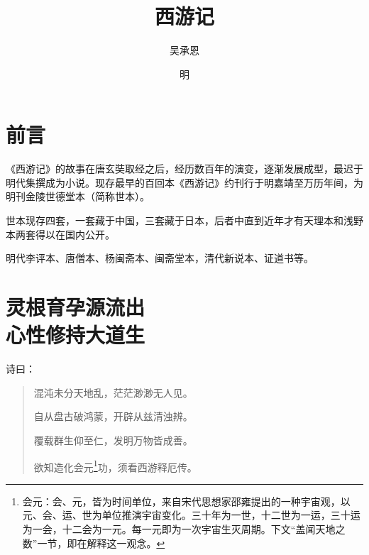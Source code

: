 \documentclass[12pt,UTF8]{ctexbook}
\title{\heiti\zihao{0} 西游记}
\author{吴承恩}
\date{明}
\begin{document}
\maketitle
\tableofcontents

\frontmatter

\chapter{前言}

《西游记》的故事在唐玄奘取经之后，经历数百年的演变，逐渐发展成型，最迟于明代集撰成为小说。现存最早的百回本《西游记》约刊行于明嘉靖至万历年间，为明刊金陵世德堂本（简称世本）。

世本现存四套，一套藏于中国，三套藏于日本，后者中直到近年才有天理本和浅野本两套得以在国内公开。

明代李评本、唐僧本、杨闽斋本、闽斋堂本，清代新说本、证道书等。

\mainmatter

\chapter[灵根育孕源流出\ 心性修持大道生]{灵根育孕源流出\\心性修持大道生}

诗曰：

\begin{quotation}
混沌未分天地乱，茫茫渺渺无人见。

自从盘古破鸿蒙，开辟从兹清浊辨。

覆载群生仰至仁，发明万物皆成善。

欲知造化会元\footnote{会元：会、元，皆为时间单位，来自宋代思想家邵雍提出的一种宇宙观，以元、会、运、世为单位推演宇宙变化。三十年为一世，十二世为一运，三十运为一会，十二会为一元。每一元即为一次宇宙生灭周期。下文“盖闻天地之数”一节，即在解释这一观念。}功，须看西游释厄传。
\end{quotation}
\end{document}
